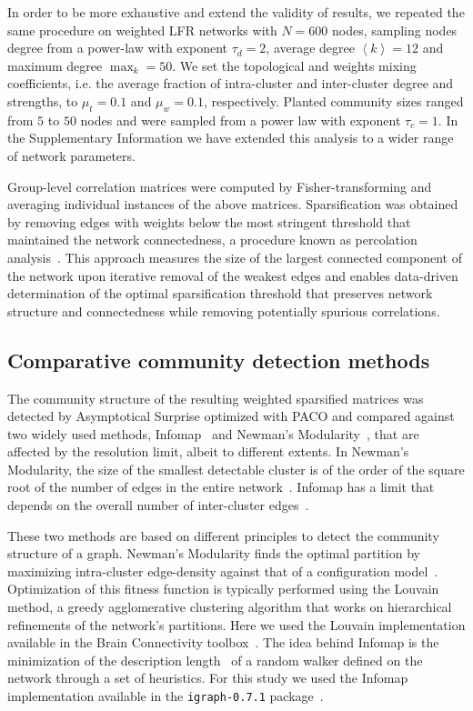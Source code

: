In order to be more exhaustive and extend the validity of results, we repeated the same procedure on weighted LFR networks with $N=600$ nodes, sampling nodes degree from a power-law with exponent $\tau_d=2$, average degree $\left<k\right>=12$ and maximum degree $\max_k=50$.
We set the topological and weights mixing coefficients, i.e. the average fraction of intra-cluster and inter-cluster degree and strengths, to $\mu_t=0.1$ and $\mu_w=0.1$, respectively. Planted community sizes ranged from $5$ to $50$ nodes and were sampled from a power law with exponent $\tau_c=1$. In the Supplementary Information we have extended this analysis to a wider range of network parameters.

Group-level correlation matrices were computed by Fisher-transforming and averaging individual instances of the above matrices. Sparsification was obtained by removing edges with weights below the most stringent threshold that maintained the network connectedness, a procedure known as  percolation analysis~\cite{gallos2012,bardella2016a,alexander-bloch2010}. This approach measures the size of the largest connected component of the network upon iterative removal of the weakest edges and enables data-driven determination of the optimal sparsification threshold that preserves network structure and connectedness while removing potentially spurious correlations.

\subsection{Comparative community detection methods}
The community structure of the resulting weighted sparsified matrices was detected by Asymptotical Surprise optimized with PACO and compared against two widely used methods, Infomap~\cite{rosvall2008} and Newman's Modularity~\cite{blondel2008,newman2006}, that  are affected by the resolution limit, albeit to different extents. 
In Newman's Modularity, the size of the smallest detectable cluster is of the order of the square root of the number of edges in the entire network~\cite{fortunato2007}. Infomap has a limit that depends on the overall number of inter-cluster edges~\cite{kawamoto2015}.

These two methods are based on different principles to detect the community structure of a graph.
Newman's Modularity finds the optimal partition by maximizing intra-cluster edge-density against that of a configuration model~\cite{newman2006}. Optimization of this fitness function is typically performed using the Louvain method, a greedy agglomerative clustering algorithm that works on hierarchical refinements of the network's partitions. Here we used the Louvain implementation available in the Brain Connectivity toolbox~\cite{rubinov2010}. 
The idea behind Infomap is the minimization of the description length~\cite{rissanen1978} of a random walker defined on the network through a set of heuristics. For this study we used the Infomap implementation available in the \texttt{igraph-0.7.1} package~\cite{igraph2006}.

